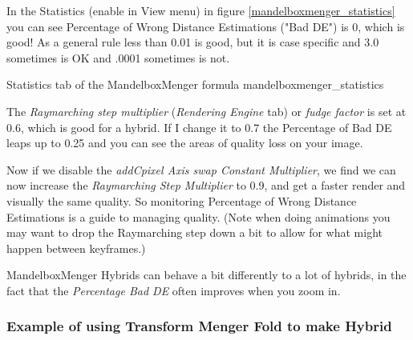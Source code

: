 In the Statistics (enable in View menu) in figure \ref{mandelboxmenger_statistics} you can see Percentage of Wrong Distance
Estimations ("Bad DE") is 0, which is good! As a general rule less than 0.01
is good, but it is case specific and 3.0 sometimes is OK and .0001 sometimes is
not.

{Statistics tab of the MandelboxMenger formula}
{mandelboxmenger_statistics}

The \emph{Raymarching step multiplier} (\emph{Rendering Engine} tab) or
\emph{fudge factor} is set at 0.6, which is good for a hybrid. If I change it to
0.7 the Percentage of Bad DE leaps up to 0.25 and you can see the areas of
quality loss on your image.

Now if we disable the \emph{addCpixel Axis swap Constant Multiplier}, we find we
can now increase the \emph{Raymarching Step Multiplier} to 0.9, and get a faster
render and visually the same quality. So monitoring Percentage of Wrong Distance
Estimations is a guide to managing quality. (Note when doing animations you may
want to drop the Raymarching step down a bit to allow for what might happen
between keyframes.)

MandelboxMenger Hybrids can behave a bit differently to a lot of hybrids, in the
fact that the \emph{Percentage Bad DE} often improves when you zoom in.



\subsubsection{Example of using Transform Menger Fold to make
	Hybrid}\label{example-of-using-transfrom-mengerfold}

